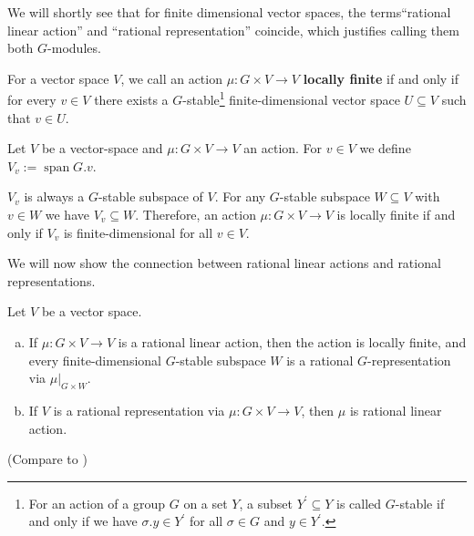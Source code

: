 We will shortly see that for finite dimensional vector spaces, the terms\linebreak ``rational linear action'' and ``rational representation'' coincide, which justifies calling them both $G$-modules.

\begin{definition}
  For a vector space $V$, we call an action $\mu \colon G \times V \rightarrow V$ \textbf{locally finite} if and only if for every $v \in V$ there exists a $G$-stable\footnote{For an action of a group $G$ on a set $Y$, a subset $Y^\prime \subseteq Y$ is called $G$-stable if and only if we have $\sigma.y \in Y^\prime$ for all $\sigma \in G$ and $y \in Y^\prime$.} finite-dimensional vector space $U \subseteq V$ such that $v \in U$.
\end{definition}

\begin{definition}
  Let $V$ be a vector-space and $\mu \colon G \times V \rightarrow V$ an action.
  For $v \in V$ we define $V_v := \operatorname{span} G.v$. %
\end{definition}

\begin{remark}
  $V_v$ is always a $G$-stable subspace of $V$. %
  For any $G$-stable subspace $W \subseteq V$ with $v \in W$ we have $V_v \subseteq W$.
  Therefore, an action $\mu \colon G \times V \rightarrow V$ is locally finite if and only if $V_v$ is finite-dimensional for all $v \in V$. %
\end{remark}

We will now show the connection between rational linear actions and rational representations.

\begin{proposition}\label{locfin}
  Let $V$ be a vector space.
  \begin{enumerate}[(a)]
  \item If $\mu \colon G \times V \rightarrow V$ is a rational linear action, then the action is locally finite, and every
    finite-dimensional $G$-stable subspace $W$ is a rational \linebreak$G$-representation via $\left. \mu \right|_{G\times W}$.
  \item If $V$ is a rational representation via $\mu \colon G \times V \rightarrow V$, then $\mu$ is rational linear action.
  \end{enumerate}

  (Compare to \cite[A.1.8, 2.2.5]{DK15})
\end{proposition}

